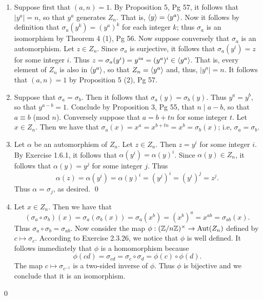 \begin{enumerate}
      \begin{enumerate}
         \item Suppose first that $(a, n) = 1$. By Proposition 5, Pg 57, it 
               follows that $|y^a| = n$, so that $y^a$ generates $Z_n$. That is, 
               $\langle y \rangle =\langle y^a \rangle$. Now it follows by definition that
               $\sigma_a(y^k) = (y^{a})^k$ for each integer $k$; thus
               $\sigma_a$ is an isomorphism by Theorem 4 (1), Pg 56. Now suppose
               conversely that $\sigma_a$ is an automorphism. Let $z \in Z_n$. 
               Since $\sigma_a$ is surjective, it follows that
               $\sigma_a(y^i) = z$ for some integer $i$. Thus
               $z = \sigma_a(y^i) = y^{ia} = ({y^a})^i \in \langle y^a \rangle$. That is,
               every element of $Z_n$ is also in $\langle y^a \rangle$, so that
               $Z_n = \langle y^a \rangle$ and, thus, $|y^a| = n$. It follows that
               $(a, n) = 1$ by Proposition 5 (2), Pg 57.
         \item Suppose that $\sigma_a = \sigma_b$. Then it follows that
               $\sigma_a(y) = \sigma_b(y)$. Thus $y^a = y^b$, so that
               $y^{a-b} = 1$. Conclude by Proposition 3, Pg 55, that
               $n \mid a - b$, so that $a \equiv b$ (mod $n$). Conversely
               suppose that $a = b + tn$ for some integer $t$. Let $x \in Z_n$.
               Then we have that
               $\sigma_a(x) = x^a = x^{b+tn} = x^b = \sigma_b(x)$; i.e,
               $\sigma_a = \sigma_b$.
         \item Let $\alpha$ be an automorphism of $Z_n$. Let $z \in Z_n$. Then
               $z = y^i$ for some integer $i$. By Exercise 1.6.1, it follows
               that $\alpha(y^i) = \alpha(y)^i$. Since $\alpha(y) \in Z_n$, it
               follows that $\alpha(y) = y^j$ for some integer $j$. Thus
               $$\alpha(z) = \alpha(y^i) = \alpha(y)^i = (y^{j})^i = (y^{i})^j
                           = z^j.$$
               Thus $\alpha = \sigma_j$, as desired. \qed
         \item Let $x \in Z_n$. Then we have that
               $$(\sigma_a\circ\sigma_b)(x) = \sigma_a(\sigma_b(x)) =
                  \sigma_a(x^b) = (x^b)^a = x^{ab} = \sigma_{ab}(x).$$
               Thus $\sigma_a \circ \sigma_b = \sigma_{ab}$. Now consider the
               map $\phi : (\mathbb{Z}/n\mathbb{Z})^\times \rightarrow \text{Aut}(Z_n)$ defined 
               by $c \mapsto \sigma_c$. According to Exercise 2.3.26, we notice
               that $\phi$ is well defined. It follows immediately that $\phi$
               is a homomorphism because 
               $$\phi(cd) = \sigma_{cd} = \sigma_c\circ\sigma_d =
                 \phi(c)\circ\phi(d).$$
               The map $c \mapsto \sigma_{c^{-1}}$ is a two-sided inverse of
               $\phi$. Thus $\phi$ is bijective and we conclude that it is an
               isomorphism.
      \end{enumerate} \qed
\end{enumerate}

